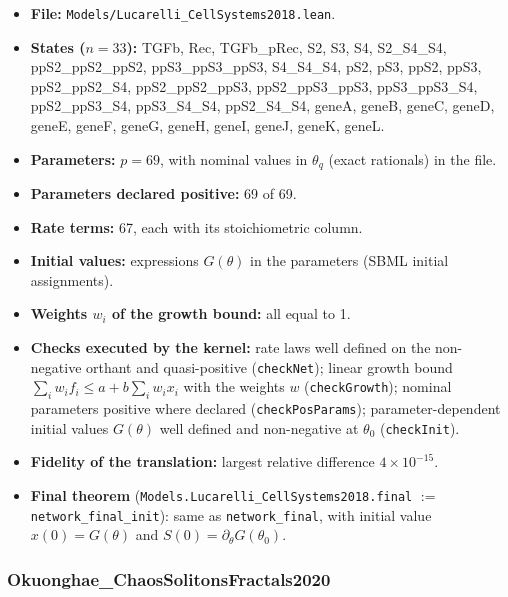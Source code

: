 \begin{itemize}\itemsep0pt\small
\item \textbf{File:} \texttt{Models/Lucarelli\_CellSystems2018.lean}.
\item \textbf{States ($n=33$):} TGFb, Rec, TGFb\_pRec, S2, S3, S4, S2\_S4\_S4, ppS2\_ppS2\_ppS2, ppS3\_ppS3\_ppS3, S4\_S4\_S4, pS2, pS3, ppS2, ppS3, ppS2\_ppS2\_S4, ppS2\_ppS2\_ppS3, ppS2\_ppS3\_ppS3, ppS3\_ppS3\_S4, ppS2\_ppS3\_S4, ppS3\_S4\_S4, ppS2\_S4\_S4, geneA, geneB, geneC, geneD, geneE, geneF, geneG, geneH, geneI, geneJ, geneK, geneL.
\item \textbf{Parameters:} $p=69$, with nominal values in \texttt{$\theta_q$} (exact rationals) in the file.
\item \textbf{Parameters declared positive:} 69 of 69.
\item \textbf{Rate terms:} 67, each with its stoichiometric column.
\item \textbf{Initial values:} expressions $G(\theta)$ in the parameters (SBML initial assignments).
\item \textbf{Weights $w_i$ of the growth bound:} all equal to 1.
\item \textbf{Checks executed by the kernel:} rate laws well defined on the non-negative orthant and quasi-positive (\texttt{checkNet}); linear growth bound $\sum_iw_if_i\le a+b\sum_iw_ix_i$ with the weights $w$ (\texttt{checkGrowth}); nominal parameters positive where declared (\texttt{checkPosParams}); parameter-dependent initial values $G(\theta)$ well defined and non-negative at $\theta_0$ (\texttt{checkInit}).
\item \textbf{Fidelity of the translation:} largest relative difference $4\times10^{-15}$.
\item \textbf{Final theorem} (\texttt{Models.Lucarelli\_CellSystems2018.final} $:=$ \texttt{network\_final\_init}): same as \texttt{network\_final}, with initial value $x(0)=G(\theta)$ and $S(0)=\partial_\theta G(\theta_0)$.
\end{itemize}

\subsubsection*{Okuonghae\_ChaosSolitonsFractals2020}

